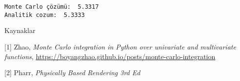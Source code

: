 \documentclass[12pt,fleqn]{article}\usepackage{../../common}
\begin{document}
\begin{verbatim}
Monte Carlo çözümü:  5.3317
Analitik cozum:  5.3333
\end{verbatim}





Kaynaklar

[1] Zhao, {\em Monte Carlo integration in Python over univariate and multivariate functions},
    \url{https://boyangzhao.github.io/posts/monte-carlo-integration}

[2] Pharr, {\em Physically Based Rendering 3rd Ed}
    
\end{document}
